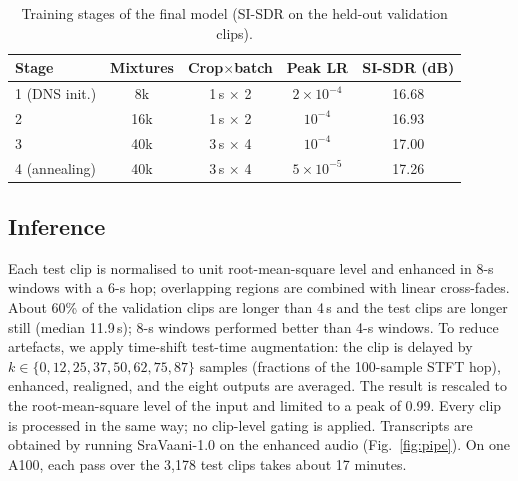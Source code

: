 \documentclass[conference]{IEEEtran}
\begin{document}
\begin{table}[t]\centering\caption{Training stages of the final model (SI-SDR on the held-out validation clips).}\label{tab:stages}\footnotesize\setlength{\tabcolsep}{2.5pt}
\begin{tabular}{lcccc}\toprule
Stage & Mixtures & Crop$\times$batch & Peak LR & SI-SDR (dB)\\\midrule
1 (DNS init.) & 8k & 1\,s $\times$ 2 & $2{\times}10^{-4}$ & 16.68\\
2 & 16k & 1\,s $\times$ 2 & $10^{-4}$ & 16.93\\
3 & 40k & 3\,s $\times$ 4 & $10^{-4}$ & 17.00\\
4 (annealing) & 40k & 3\,s $\times$ 4 & $5{\times}10^{-5}$ & 17.26\\\bottomrule
\end{tabular}\end{table}

\subsection{Inference}
Each test clip is normalised to unit root-mean-square level and enhanced in 8-s windows with a 6-s hop; overlapping regions are combined with linear cross-fades. About 60\% of the validation clips are longer than 4\,s and the test clips are longer still (median 11.9\,s); 8-s windows performed better than 4-s windows. To reduce artefacts, we apply time-shift test-time augmentation: the clip is delayed by $k \in \{0, 12, 25, 37, 50, 62, 75, 87\}$ samples (fractions of the 100-sample STFT hop), enhanced, realigned, and the eight outputs are averaged. The result is rescaled to the root-mean-square level of the input and limited to a peak of 0.99. Every clip is processed in the same way; no clip-level gating is applied. Transcripts are obtained by running SraVaani-1.0 on the enhanced audio (Fig.~\ref{fig:pipe}). On one A100, each pass over the 3{,}178 test clips takes about 17 minutes.
\end{document}
